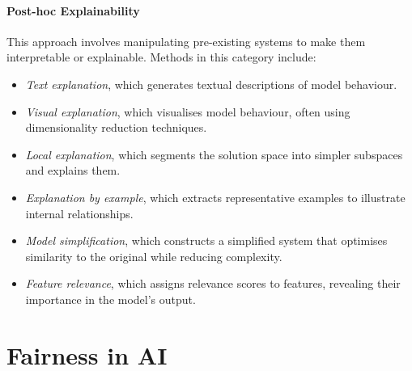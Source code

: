 \paragraph{Post-hoc Explainability}
%
This approach involves manipulating pre-existing systems to make them interpretable or explainable.
%
Methods in this category include:
%
\begin{itemize}
    \item \emph{Text explanation}, which generates textual descriptions of model behaviour.
    \item \emph{Visual explanation}, which visualises model behaviour, often using dimensionality reduction techniques.
    \item \emph{Local explanation}, which segments the solution space into simpler subspaces and explains them.
    \item \emph{Explanation by example}, which extracts representative examples to illustrate internal relationships.
    \item \emph{Model simplification}, which constructs a simplified system that optimises similarity to the original while reducing complexity.
    \item \emph{Feature relevance}, which assigns relevance scores to features, revealing their importance in the model's output.
\end{itemize}


\section[Fairness in AI]{Fairness in \gls{AI}}
\label{subsec:fairness-in-ai}

